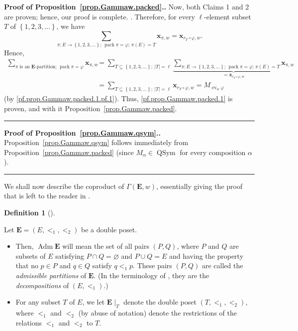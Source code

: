 \documentclass[numbers=enddot,12pt,final,onecolumn,notitlepage,abstracton]{scrartcl}
\theoremstyle{definition}
\newtheorem{defi}[theo]{Definition}
\newenvironment{definition}[1][]
{\begin{defi}[#1]\begin{leftbar}}
{\end{leftbar}\end{defi}}
\newenvironment{proof}[1][Proof]{\noindent\textbf{#1.} }{\ \rule{0.5em}{0.5em}}
\let\sumnonlimits\sum
\renewcommand{\sum}{\sumnonlimits\limits}
\newcommand{\xx}{{\mathbf{x}}}
\newcommand{\ev}{\operatorname{ev}}
\newcommand{\Adm}{\operatorname{Adm}}
\newcommand{\pack}{\operatorname{pack}}
\newcommand{\QSym}{{\operatorname{QSym}}}
\newcommand{\EE}{{\mathbf{E}}}
\begin{document}
\begin{proof}[Proof of Proposition~\ref{prop.Gammaw.packed}.]
{Now, both Claims 1 and 2 are proven; hence, our proof is complete.
}. Therefore, for every $\ell$-element subset $T$ of
$\left\{1, 2, 3, \ldots\right\}$, we have
\[
\sum_{\pi : E \to \left\{1, 2, 3, \ldots\right\} \text{; } \pack \pi = \varphi
\text{; } \pi\left(E\right) = T}
\xx_{\pi, w}
= \xx_{r_T\circ\varphi,w} .
\]
Hence,
\begin{align*}
\sum_{\pi\text{ is an }\EE\text{-partition; } \pack \pi = \varphi}
\xx_{\pi, w}
&= \sum_{T \subseteq \left\{1, 2, 3, \ldots\right\} ; \ \left|T\right| = \ell}
\underbrace{\sum_{\pi : E \to \left\{1, 2, 3, \ldots\right\} \text{; } \pack \pi = \varphi
\text{; } \pi\left(E\right) = T}
\xx_{\pi, w}}_{= \xx_{r_T\circ\varphi,w}} \\
&= \sum_{T \subseteq \left\{1, 2, 3, \ldots\right\} ; \ \left|T\right| = \ell}
\xx_{r_T\circ\varphi,w}
= M_{\ev_w \varphi}
\end{align*}
(by \eqref{pf.prop.Gammaw.packed.1.pf.1}).
Thus, \eqref{pf.prop.Gammaw.packed.1}
is proven, and with it Proposition~\ref{prop.Gammaw.packed}.
\end{proof}

\begin{proof}[Proof of Proposition~\ref{prop.Gammaw.qsym}.]
Proposition~\ref{prop.Gammaw.qsym} follows immediately from
Proposition~\ref{prop.Gammaw.packed}
(since $M_\alpha \in \QSym$ for every composition $\alpha$).
\end{proof}

We shall now describe the coproduct of $\Gamma\left(\EE, w\right)$,
essentially giving the proof that is left to the reader in
\cite[Theorem 2.2]{Mal-Reu-DP}.

\begin{definition}
Let $\EE = \left(E, <_1, <_2\right)$ be a double poset.

\begin{itemize}

\item[(a)]
Then, $\Adm \EE$ will mean the set of all pairs
$\left(P, Q\right)$, where $P$ and $Q$ are subsets of $E$ satisfying
$P \cap Q = \varnothing$ and $P \cup Q = E$ and having the property
that no $p \in P$ and $q \in Q$ satisfy $q <_1 p$. These pairs
$\left(P, Q\right)$ are
called the \textit{admissible partitions} of $\EE$. (In the
terminology of \cite{Mal-Reu-DP}, they are the
\textit{decompositions} of $\left(E, <_1\right)$.)

\item[(b)] For
any subset $T$ of $E$, we let $\EE\mid_T$ denote the double poset
$\left(T, <_1, <_2\right)$, where $<_1$ and $<_2$ (by abuse of
notation) denote the restrictions of the relations $<_1$ and $<_2$
to $T$.

\end{itemize}
\end{definition}
\end{document}
